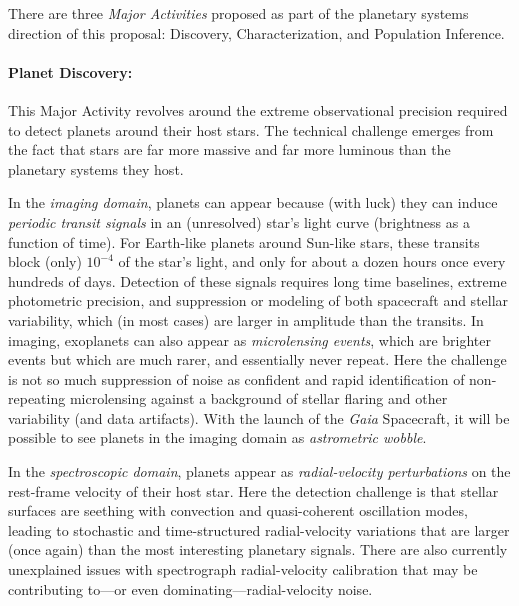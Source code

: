 \documentclass[12pt]{article}
\begin{document}
There are three \emph{Major Activities} proposed as part of the
planetary systems direction of this proposal: Discovery,
Characterization, and Population Inference.

\paragraph{Planet Discovery:}
This Major Activity revolves around the
extreme observational precision required to detect planets around
their host stars. The technical challenge emerges from the fact that
stars are far more massive and far more luminous than the
planetary systems they host.

In the \emph{imaging domain}, planets can appear because (with luck)
they can induce \emph{periodic transit signals} in an (unresolved) star's light
curve (brightness as a function of time). For Earth-like planets
around Sun-like stars, these transits block (only) $10^{-4}$ of the
star's light, and only for about a dozen hours once every hundreds of
days. Detection of these signals requires long time baselines, extreme
photometric precision, and suppression or modeling of both spacecraft and stellar
variability, which (in most cases) are larger in amplitude than the
transits. In imaging, exoplanets can also appear as \emph{microlensing
  events}, which are brighter events but which are much rarer, and
essentially never repeat. Here the challenge is not so much
suppression of noise as confident and rapid identification of
non-repeating microlensing against a background of stellar flaring and
other variability (and data artifacts). With the launch of the
\textsl{Gaia} Spacecraft, it will be possible to see planets in the
imaging domain as \emph{astrometric wobble}.

In the \emph{spectroscopic domain}, planets appear as
\emph{radial-velocity perturbations} on the rest-frame velocity of
their host star. Here the detection challenge is that stellar surfaces
are seething with convection and quasi-coherent oscillation modes,
leading to stochastic and time-structured radial-velocity variations
that are larger (once again) than the most interesting planetary
signals. There are also currently unexplained issues with spectrograph
radial-velocity calibration that may be contributing to---or even
dominating---radial-velocity noise.
\end{document}
